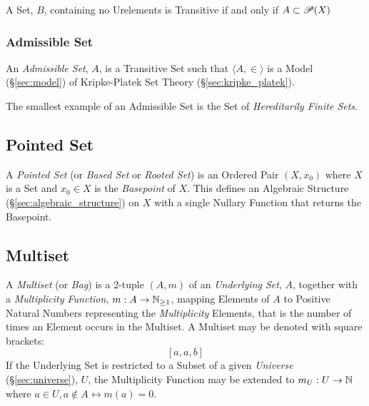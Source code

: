 A Set, $B$, containing no Urelements is Transitive if and only if $A
\subset \mathscr{P}(X)$



\subsubsection{Admissible Set}\label{sec:admissible_set}

An \emph{Admissible Set}, $A$, is a Transitive Set such that $\langle
A, \in \rangle$ is a Model (\S\ref{sec:model}) of Kripke-Platek Set
Theory (\S\ref{sec:kripke_platek}).

The smallest example of an Admissible Set is the Set of
\emph{Hereditarily Finite Sets}. %



\subsection{Pointed Set}\label{sec:pointed_set}

A \emph{Pointed Set} (or \emph{Based Set} or \emph{Rooted Set}) is an
Ordered Pair $(X, x_0)$ where $X$ is a Set and $x_0 \in X$ is the
\emph{Basepoint} of $X$. This defines an Algebraic Structure
(\S\ref{sec:algebraic_structure}) on $X$ with a single Nullary
Function that returns the Basepoint.



\subsection{Multiset}\label{sec:multiset}

A \emph{Multiset} (or \emph{Bag}) is a 2-tuple $(A,m)$ of an
\emph{Underlying Set}, $A$, together with a \emph{Multiplicity
  Function}, $m : A \rightarrow \mathbb{N}_{\geq 1}$, mapping Elements
of $A$ to Positive Natural Numbers representing the
\emph{Multiplicity} Elements, that is the number of times an Element
occurs in the Multiset. A Multiset may be denoted with square
brackets:
\[
  [a,a,b]
\]
If the Underlying Set is restricted to a Subset of a given
\emph{Universe} (\S\ref{sec:universe}), $U$, the Multiplicity Function
may be extended to $m_U : U \rightarrow \mathbb{N}$ where $a \in U, a
\notin A \leftrightarrow m(a)=0$.

